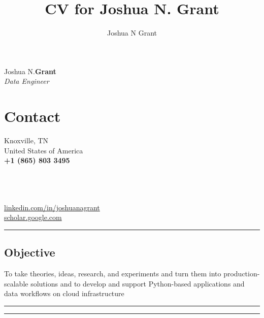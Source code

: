 \documentclass[10pt]{article}%
\author{Joshua N Grant}
\title{CV for Joshua N. Grant}
\begin{document}
\begin{minipage}[ht]{.33\linewidth}%
  \setlength{\headsep}{-10pt}%
  \setlength{\voffset}{-0.75in}%
  {\Large Joshua N.\huge\textbf{Grant}} \\
   \large \textit{Data Engineer}
\end{minipage}
\begin{minipage}[ht]{.25\linewidth}%
  \section*{\faUser{} Contact}%
  Knoxville, TN \\
  United States of America \\
  \textbf{+1 (865) 803 3495} \faMobile{} \\
\end{minipage}
\begin{minipage}[ht]{.5\linewidth}%
  \href{mailto:jngrant@live.com}{\color{linkcolor}{jngrant@live.com \faEnvelope}} \\
  \href{https://notjustadatum.blogspot.com}{\color{linkcolor}{notjustadatum.blogspot.com \faBold}} \\
  \href{https://github.com/sempervent}{\color{linkcolor}{github.com/sempervent \faGithubAlt}} \\
  \href{https://www.linkedin.com/in/joshuanagrant}{\color{linkcolor} {\small linkedin.com/in/joshuanagrant} \faLinkedin} \\
  \href{https://scholar.google.com/citations?user=vs-HJQcAAAAJ&hl=en}{\color{linkcolor} {scholar.google.com \faPencil}}
\end{minipage}
\par\noindent\rule{\textwidth}{0.4pt}
\begin{center}
\section*{\faBullseye{} Objective}%
To take theories, ideas, research, and experiments and turn them into production-scalable solutions and to develop and support Python-based applications and data workflows on cloud infrastructure
\end{center}
\par\noindent\rule{\textwidth}{0.4pt}
\par\noindent\rule{\textwidth}{0.4pt}
\end{document}
